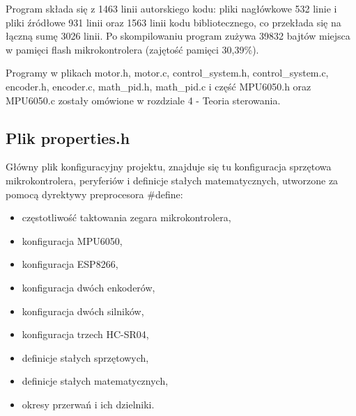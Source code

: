 \documentclass[a4paper,12pt,twoside,openany]{report}
\begin{document}
Program składa się z 1463 linii autorskiego kodu: pliki nagłówkowe 532 linie i pliki źródłowe 931 linii oraz 1563 linii kodu bibliotecznego, co przekłada się na łączną sumę 3026 linii. Po skompilowaniu program zużywa 39832 bajtów miejsca w pamięci flash mikrokontrolera (zajętość pamięci 30,39\%).

Programy w plikach motor.h, motor.c, control\_system.h, control\_system.c, encoder.h, encoder.c, math\_pid.h, math\_pid.c i część MPU6050.h oraz MPU6050.c zostały omówione w rozdziale 4 - Teoria sterowania. 



\subsection{Plik properties.h}

Główny plik konfiguracyjny projektu, znajduje się tu konfiguracja sprzętowa mikrokontrolera, peryferiów i definicje stałych matematycznych, utworzone za pomocą dyrektywy preprocesora \#define:
\begin{itemize}
\item częstotliwość taktowania zegara mikrokontrolera,
\item konfiguracja MPU6050,
\item konfiguracja ESP8266,
\item konfiguracja dwóch enkoderów,
\item konfiguracja dwóch silników,
\item konfiguracja trzech HC-SR04,
\item definicje stałych sprzętowych,
\item definicje stałych matematycznych,
\item okresy przerwań i ich dzielniki.
\end{itemize}
\end{document}
